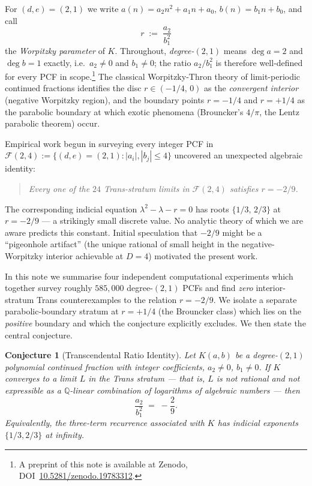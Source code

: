 \documentclass[11pt]{amsart}
\newtheorem{conjecture}[theorem]{Conjecture}
\theoremstyle{definition}
\theoremstyle{remark}
\newcommand{\FF}{\mathcal{F}}
\begin{document}
For $(d,e) = (2,1)$ we write $a(n) = a_2 n^2 + a_1 n + a_0$,
$b(n) = b_1 n + b_0$, and call
\begin{equation}\label{eq:r-defn}
  r \;:=\; \frac{a_2}{b_1^2}
\end{equation}
the \emph{Worpitzky parameter} of $K$.  Throughout, \emph{degree-$(2,1)$}
means $\deg a = 2$ and $\deg b = 1$ exactly, i.e.\ $a_2 \neq 0$ and
$b_1 \neq 0$; the ratio $a_2/b_1^2$ is therefore well-defined for
every PCF in scope.\footnote{A preprint of this note is available at
Zenodo, DOI~\href{https://doi.org/10.5281/zenodo.19783312}{10.5281/zenodo.19783312}.}  The classical Worpitzky-Thron
theory of limit-periodic continued fractions identifies the disc
$r \in (-1/4,\,0)$ as the \emph{convergent interior} (negative
Worpitzky region), and the boundary points $r = -1/4$ and $r = +1/4$
as the parabolic boundary at which exotic phenomena (Brouncker's
$4/\pi$, the Lentz parabolic theorem) occur.

Empirical work begun in \cite{PCF25} surveying every integer PCF in
$\FF(2,4) := \{(d,e)=(2,1) : |a_i|, |b_j| \le 4\}$ uncovered an
unexpected algebraic identity:
\begin{quote}
\itshape Every one of the $24$ Trans-stratum limits in $\FF(2,4)$
satisfies $r = -2/9$.
\end{quote}
The corresponding indicial equation $\lambda^2 - \lambda - r = 0$
has roots $\{1/3,\,2/3\}$ at $r = -2/9$ --- a strikingly small
discrete value.  No analytic theory of which we are aware predicts
this constant.  Initial speculation that $-2/9$ might be a
``pigeonhole artifact'' (the unique rational of small height in the
negative-Worpitzky interior achievable at $D = 4$) motivated the
present work.

In this note we summarise four independent computational experiments
which together survey roughly $585{,}000$ degree-$(2,1)$ PCFs and
find \emph{zero} interior-stratum Trans counterexamples to the
relation $r = -2/9$.  We isolate a separate parabolic-boundary stratum at
$r = +1/4$ (the Brouncker class) which lies on the \emph{positive}
boundary and which the conjecture explicitly excludes.  We then
state the central conjecture.

\begin{conjecture}[Transcendental Ratio Identity]\label{conj:tri}
Let $K(a, b)$ be a degree-$(2,1)$ polynomial continued fraction with
integer coefficients, $a_2 \ne 0$, $b_1 \ne 0$.  If $K$ converges to
a limit $L$ in the Trans stratum --- that is, $L$ is not rational and
not expressible as a $\mathbb Q$-linear combination of logarithms of
algebraic numbers --- then
\begin{equation}\label{eq:conj}
  \frac{a_2}{b_1^2} \;=\; -\frac{2}{9}.
\end{equation}
Equivalently, the three-term recurrence associated with $K$ has
indicial exponents $\{1/3, 2/3\}$ at infinity.
\end{conjecture}
\end{document}
